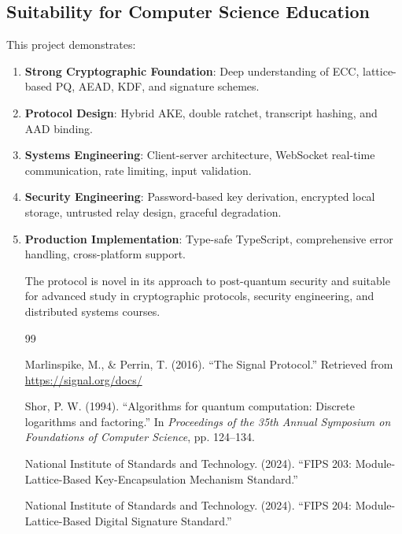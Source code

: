 \documentclass[11pt,a4paper,oneside]{article}
\begin{document}
\subsection{Suitability for Computer Science Education}

This project demonstrates:

\begin{enumerate}
\item \textbf{Strong Cryptographic Foundation}: Deep understanding of ECC, lattice-based PQ, AEAD, KDF, and signature schemes.

\item \textbf{Protocol Design}: Hybrid AKE, double ratchet, transcript hashing, and AAD binding.

\item \textbf{Systems Engineering}: Client-server architecture, WebSocket real-time communication, rate limiting, input validation.

\item \textbf{Security Engineering}: Password-based key derivation, encrypted local storage, untrusted relay design, graceful degradation.

\item \textbf{Production Implementation}: Type-safe TypeScript, comprehensive error handling, cross-platform support.

The protocol is novel in its approach to post-quantum security and suitable for advanced study in cryptographic protocols, security engineering, and distributed systems courses.

\newpage
\begin{thebibliography}{99}

Marlinspike, M., \& Perrin, T. (2016).
``The Signal Protocol.''
Retrieved from \url{https://signal.org/docs/}

Shor, P. W. (1994).
``Algorithms for quantum computation: Discrete logarithms and factoring.''
In \textit{Proceedings of the 35th Annual Symposium on Foundations of Computer Science}, pp. 124--134.

National Institute of Standards and Technology. (2024).
``FIPS 203: Module-Lattice-Based Key-Encapsulation Mechanism Standard.''

National Institute of Standards and Technology. (2024).
``FIPS 204: Module-Lattice-Based Digital Signature Standard.''


\end{thebibliography}
\end{enumerate}
\end{document}
